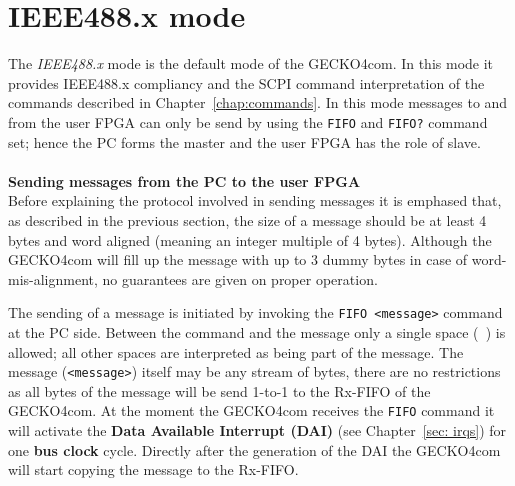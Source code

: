 \section{IEEE488.x mode}
The \emph{IEEE488.x} mode is the default mode of the {\sc GECKO4com}. In this
mode it provides IEEE488.x compliancy and the SCPI command interpretation of the
commands described in Chapter~\ref{chap:commands}. In this mode messages to and
from the user FPGA can {\sc only} be send by using the \verb+FIFO+ and
\verb+FIFO?+ command set; hence the PC forms the master and the user FPGA has
the role of slave.\\
 \\
\textbf{Sending messages from the PC to the user FPGA}\\
Before explaining the protocol involved in sending messages it is emphased that,
 as described in the previous section, the size of a message should be at least
4 bytes and word aligned (meaning an integer multiple of 4 bytes). Although
the {\sc GECKO4com} will fill up the message with up to 3 dummy bytes in case of
word-mis-alignment, no guarantees are given on proper operation.

The sending of a message is initiated by invoking the \verb*+FIFO <message>+
command at the PC side. Between the command and the message only a single space
(\verb*+ +) is allowed; all other spaces are interpreted as being part of the
message. The message (\verb+<message>+) itself may be any stream of bytes, there
are no restrictions as all bytes of the message will be send 1-to-1 to the
Rx-FIFO of the {\sc GECKO4com}. At the moment the {\sc GECKO4com} receives the
\verb+FIFO+ command it will activate the \textbf{Data Available Interrupt (DAI)} 
(see Chapter~\ref{sec: irqs}) for one \textbf{bus clock} cycle. Directly after
the generation of the DAI the {\sc GECKO4com} will start copying the message to
the Rx-FIFO.

